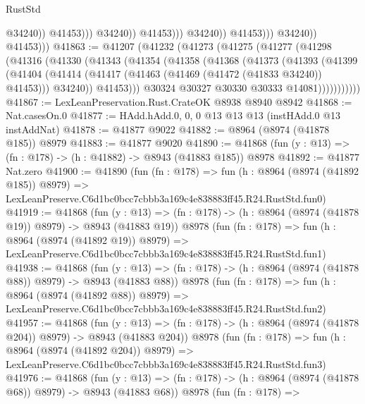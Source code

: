\begin{lexlean}{RustStd}
\begin{coremodule}
                                            @34240))
                                        @41453)))
                                  @34240))
                              @41453)))
                        @34240))
                    @41453)))
              @34240))
          @41453)))
@41863 := @41207
    (@41232
      (@41273
        (@41275
          (@41277
            (@41298
              (@41316
                (@41330
                  (@41343
                    (@41354
                      (@41358
                        (@41368
                          (@41373
                            (@41393
                              (@41399
                                (@41404
                                  (@41414
                                    (@41417 (@41463 (@41469 (@41472 (@41833 @34240)) @41453)))
                                    @34240))
                                @41453)))
                          @30324
                          @30327
                          @30330
                          @30333
                          @14081)))))))))))
@41867 := LexLeanPreservation.Rust.CrateOK @8938 @8940 @8942
@41868 := Nat.casesOn.{0}
@41877 := HAdd.hAdd.{0, 0, 0} @13 @13 @13 (instHAdd.{0} @13 instAddNat)
@41878 := @41877 @9022
@41882 := @8964 (@8974 (@41878 @185)) @8979
@41883 := @41877 @9020
@41890 := @41868 (fun (y : @13) => (fn : @178) -> (h : @41882) -> @8943 (@41883 @185)) @8978
@41892 := @41877 Nat.zero
@41900 := @41890
    (fun (fn : @178) =>
    fun (h : @8964 (@8974 (@41892 @185)) @8979) =>
    LexLeanPreserve.C6d1bc0bcc7cbbb3a169c4e838883ff45.R24.RustStd.fun0)
@41919 := @41868
    (fun (y : @13) => (fn : @178) -> (h : @8964 (@8974 (@41878 @19)) @8979) -> @8943 (@41883 @19))
    @8978
    (fun (fn : @178) =>
    fun (h : @8964 (@8974 (@41892 @19)) @8979) =>
    LexLeanPreserve.C6d1bc0bcc7cbbb3a169c4e838883ff45.R24.RustStd.fun1)
@41938 := @41868
    (fun (y : @13) => (fn : @178) -> (h : @8964 (@8974 (@41878 @88)) @8979) -> @8943 (@41883 @88))
    @8978
    (fun (fn : @178) =>
    fun (h : @8964 (@8974 (@41892 @88)) @8979) =>
    LexLeanPreserve.C6d1bc0bcc7cbbb3a169c4e838883ff45.R24.RustStd.fun2)
@41957 := @41868
    (fun (y : @13) => (fn : @178) -> (h : @8964 (@8974 (@41878 @204)) @8979) -> @8943 (@41883 @204))
    @8978
    (fun (fn : @178) =>
    fun (h : @8964 (@8974 (@41892 @204)) @8979) =>
    LexLeanPreserve.C6d1bc0bcc7cbbb3a169c4e838883ff45.R24.RustStd.fun3)
@41976 := @41868
    (fun (y : @13) => (fn : @178) -> (h : @8964 (@8974 (@41878 @68)) @8979) -> @8943 (@41883 @68))
    @8978
    (fun (fn : @178) =>

\end{coremodule}
\end{lexlean}
